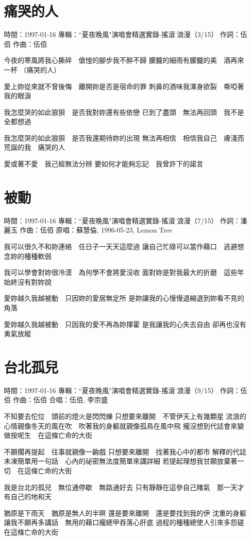 \documentclass[UTF8,a4paper,oneside,twocolumn,12pt]{ctexbook}
\newcommand{\infopair}[2]{\textbullet #1：#2}
\newcommand{\zc}[1][伍佰]{\infopair{作詞}{#1}}
\newcommand{\zq}[1][伍佰]{\infopair{作曲}{#1}}
\newcommand{\zj}[1]{\infopair{專輯}{#1}}
\newcommand{\yc}[1]{\infopair{原唱}{#1}}
\newcommand{\sj}[1]{\infopair{時間}{#1}}
\newenvironment{info}{\begin{flushleft}\kaishu
	}
	{\end{flushleft}\normalsize\yahei\par}
\newenvironment{lyric}{
	}
{}
\begin{document}
\section{痛哭的人}
\begin{info}
	\sj{1997-01-16}
	\zj{``夏夜晚風"演唱會精選實錄-搖滾˙浪漫（3/15）}
	\zc
	\zq
\end{info}
\begin{lyric}
	今夜的寒風將我心撕碎　傖惶的腳步我不醉不歸
	朦朧的細雨有朦朧的美　酒再來一杯 （痛哭的人）

	愛上妳從來就不曾後悔　離開妳是否是宿命的罪
	刺鼻的酒味我渾身欲裂　嘶啞著我的眼淚

	我怎麼哭的如此狼狽　是否我對妳還有些依戀
	已到了盡頭　無法再回頭　我不是全都想過

	我怎麼哭的如此狼狽　是否我還期待妳的出現
	無法再相信　相信我自己　膚淺而荒誕的我　痛哭的人

	愛或著不愛　我己經無法分辨
	要如何才能夠忘記　我曾許下的諾言
\end{lyric}

\section{被動}
\begin{info}
	\sj{1997-01-16}
	\zj{``夏夜晚風"演唱會精選實錄-搖滾˙浪漫（7/15）}
	\zc[潘麗玉]
	\zq
	\yc{蘇慧倫, 1996-05-23, Lemon Tree}
\end{info}
\begin{lyric}
	我可以很久不和妳連絡　任日子一天天這麼過
	讓自己忙碌可以當作藉口　逃避想念妳的種種軟弱

	我可以學會對妳很冷漠　為何學不會將愛沒收
	面對妳是對我最大的折磨　這些年始終沒有對妳說

	愛妳越久我越被動　只因妳的愛居無定所
	是妳讓我的心慢慢退縮退到妳看不見的角落

	愛妳越久我越被動　只因我的愛不再為妳揮霍
	是我讓我的心失去自由  卻再也沒有勇氣放縱
\end{lyric}

\section{台北孤兒}
\begin{info}
	\sj{1997-01-16}
	\zj{``夏夜晚風"演唱會精選實錄-搖滾˙浪漫（9/15）}
	\zc
	\zq
	\infopair{合唱}{伍佰, 李宗盛}
\end{info}
\begin{lyric}
	不知要去佗位　頭前的燈火是閃閃爍
	只想要來離開　不管伊天上有幾顆星
	流浪的心情親像冬天的風在吹　吹著我的身軀就親像孤鳥在風中飛
	攏沒想到代誌會來變做按呢生　在這條亡命的大街

	不願擱再提起　往事就親像一齣戲
	只想要來離開　找著我心中的都市
	解釋的代誌未凍簡單用一句話　心內的祕密無法度簡單來講詳細
	若提起理想我甘願放棄著一切　在這條亡命的大街

	我是台北的孤兒　無位通停歇　無路通好去
	只有靜靜在這參自己賭氣　那一天才有自己的地和天

	猶原是下雨天　猶原是無人的半暝
	還是要來離開　還是要找到我的伊
	沈重的身軀讓我不願再多講話　無用的藉口攏總甲吞落心肝底
	過程的種種總使人引來多怨磋　在這條亡命的大街
\end{lyric}
\end{document}
